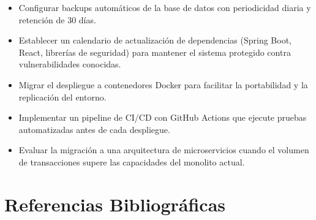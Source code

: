 \documentclass[12pt, letterpaper]{report}
\begin{document}
\begin{itemize}
    \item Configurar backups automáticos de la base de datos con periodicidad diaria y retención de 30 días.
    \item Establecer un calendario de actualización de dependencias (Spring Boot, React, librerías de seguridad) para mantener el sistema protegido contra vulnerabilidades conocidas.
    \item Migrar el despliegue a contenedores Docker para facilitar la portabilidad y la replicación del entorno.
    \item Implementar un pipeline de CI/CD con GitHub Actions que ejecute pruebas automatizadas antes de cada despliegue.
    \item Evaluar la migración a una arquitectura de microservicios cuando el volumen de transacciones supere las capacidades del monolito actual.
\end{itemize}


\chapter*{Referencias Bibliográficas}
\end{document}
